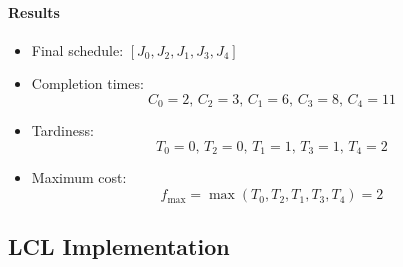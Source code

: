 \documentclass[fleqn]{article}
\begin{document}
    \paragraph{Results}
    \begin{itemize}
        \item Final schedule: $[J_0, J_2, J_1, J_3, J_4]$
        \item Completion times:
        \[
        C_0 = 2, \, C_2 = 3, \, C_1 = 6, \, C_3 = 8, \, C_4 = 11
        \]
        \item Tardiness:
        \[
        T_0 = 0, \, T_2 = 0, \, T_1 = 1, \, T_3 = 1, \, T_4 = 2
        \]
        \item Maximum cost:
        \[
        f_{\text{max}} = \max(T_0, T_2, T_1, T_3, T_4) = 2
        \]
    \end{itemize}

    \subsection{LCL Implementation}
\end{document}
